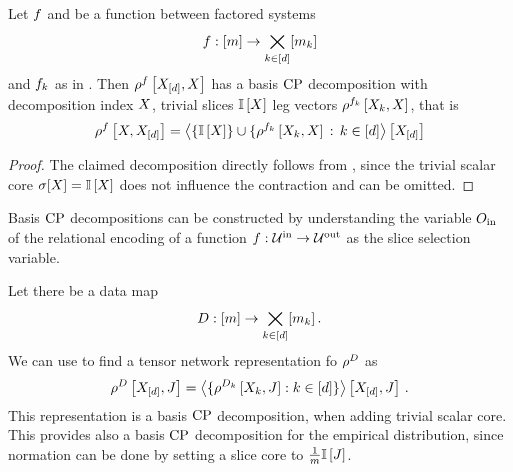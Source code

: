 \begin{theorem}
    \label{the:functionDecompositionBasisCP}
    Let $f$ and be a function between factored systems
    \begin{align*}
        f : [m] \rightarrow  \bigtimes_{k\in[d]}[m_{k}]
    \end{align*}
    and $f_{k}$ as in .
    Then $\rho^{f}\left[X_{[d]},X\right]$ has a basis $\mathrm{CP}$ decomposition with decomposition index $X$, trivial slices $\mathbb{I}\left[X\right]$ leg vectors $\rho^{f_{k}}\left[X_{k},X\right]$, that is
    \begin{align*}
        \rho^{f}\left[X,X_{[d]}\right]
        = \left\langle \{\mathbb{I}\left[X\right]\} \cup \{\rho^{f_{k}}\left[X_{k},X\right]\,:\,k\in[d]\right\rangle \left[ X_{[d]} \right]
    \end{align*}
\end{theorem}
\begin{proof}
    The claimed decomposition directly follows from , since the trivial scalar core $\sigma[X]=\mathbb{I}\left[X\right]$ does not influence the contraction and can be omitted.
\end{proof}

Basis $\mathrm{CP}$ decompositions can be constructed by understanding the variable $O_{\mathrm{in}}$ of the relational encoding of a function $f:\mathcal{U}^{\mathrm{in}} \rightarrow \mathcal{U}^{\mathrm{out}}$ as the slice selection variable.

\begin{example}
    \label{exa:empDistCP}
    Let there be a data map
    \begin{align*}
        D : [m] \rightarrow \bigtimes_{k\in[d]}[m_{k}] \, .
    \end{align*}
    We can use  to find a tensor network representation fo $\rho^{D}$ as
    \begin{align*}
        \rho^{D}\left[X_{[d]},J\right]
        = \left\langle 
            \{\rho^{D_{k}}\left[X_{k},J\right] : k\in[d] \}
        \right\rangle \left[ X_{[d]},J \right] \, .
    \end{align*}
    This representation is a basis $\mathrm{CP}$ decomposition, when adding trivial scalar core.
    This provides also a basis $\mathrm{CP}$ decomposition for the empirical distribution, since normation can be done by setting a slice core to $\frac{1}{m}\mathbb{I}\left[J\right]$.
\end{example}

